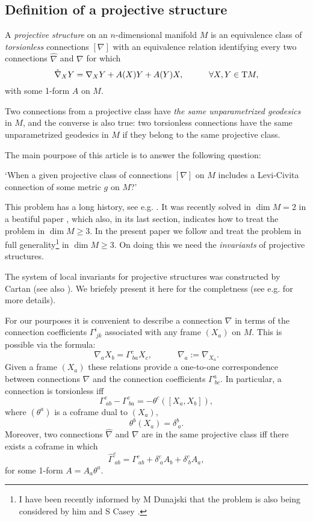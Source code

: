 \documentclass[letterpaper]{amsart}
\theoremstyle{definition}
\theoremstyle{remark}
\newcommand{\be}{\begin{equation}}
\newcommand{\ee}{\end{equation}}
\begin{document}
\subsection{Definition of a projective structure}
A \emph{projective structure} on an $n$-dimensional manifold $M$ is an
equivalence class of \emph{torsionless} connections $[\nabla]$ with an
equivalence relation identifying every two connections $\hat{\nabla}$ and 
$\nabla$ for which 
\be
\hat{\nabla}_XY=\nabla_XY+A(X)Y+A(Y)X,\quad\quad\quad\forall X,Y\in{\rm T}M,\label{prst}\ee
with some 1-form $A$ on $M$. 

Two connections from a projective class have \emph{the same 
unparametrized geodesics} in $M$, and the converse is also true: two
torsionless connections have the same unparametrized geodesics in $M$
if they belong to the same projective class.

The main pourpose of this article is to answer the following question:

`When a given projective class of connections $[\nabla]$ on $M$ includes a
Levi-Civita connection of some metric $g$ on $M$?'


This problem has a long history, see e.g. \cite{liu,mik,sin}. It was
recently solved in $\dim M=2$ in a beatiful paper \cite{bde}, which
also, in its last section, indicates how to treat the problem in $\dim
M\geq 3$. In the present paper we follow \cite{bde} and treat the
problem in full generality\footnote{I have been recently informed by M Dunajski that the problem is also
being considered by him and S Casey \cite{cas}.} in $\dim M\geq 3$. On doing this we need
the \emph{invariants} of projective structures.


  
The system of local invariants for projective structures was
constructed by Cartan \cite{car} (see also \cite{tom}). We briefely present it here for the
completness (see e.g. \cite{ea,kob,nn} for more details).

For our pourposes it is convenient to describe a connection $\nabla$
in terms of the connection coefficients $\Gamma^i_{~jk}$ associated
with any frame $(X_a)$ on $M$. This is possible via the formula: 
$$\nabla_{a}X_b=\Gamma^c_{~ba}X_c,\quad\quad\quad \nabla_a:=\nabla_{X_a}.$$ Given a frame $(X_a)$ these
relations provide a one-to-one correspondence between connections
$\nabla$ and the connection coefficients $\Gamma^a_{~bc}$. In particular,
a connection is torsionless iff 
$$\Gamma^c_{~ab}-\Gamma^c_{~ba}=-\theta^c([X_a,X_b]),$$ where
$(\theta^a)$ is a coframe dual to $(X_a)$,
$$\theta^b(X_a)=\delta^b_{~a}.$$ 
Moreover, two connections $\hat{\nabla}$ and
$\nabla$ are in the same projective class iff there exists a coframe in which 
$$\hat{\Gamma}^c_{~ab}=\Gamma^c_{~ab}+\delta^c_{~a}A_b+\delta^c_{~b}A_a,$$
for some 1-form $A=A_a\theta^a$. 
\end{document}
